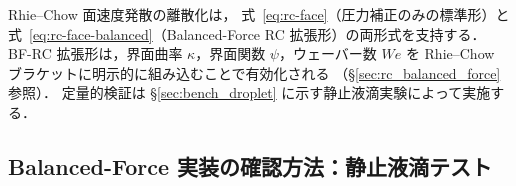 Rhie--Chow 面速度発散の離散化は，
式~\eqref{eq:rc-face}（圧力補正のみの標準形）と
式~\eqref{eq:rc-face-balanced}（Balanced-Force RC 拡張形）の両形式を支持する．
BF-RC 拡張形は，界面曲率 $\kappa$，界面関数 $\psi$，ウェーバー数 $We$ を
Rhie--Chow ブラケットに明示的に組み込むことで有効化される
（§\ref{sec:rc_balanced_force} 参照）．
定量的検証は §\ref{sec:bench_droplet} に示す静止液滴実験によって実施する．

\subsection{Balanced-Force 実装の確認方法：静止液滴テスト}
\label{sec:impl_bf_verify}

